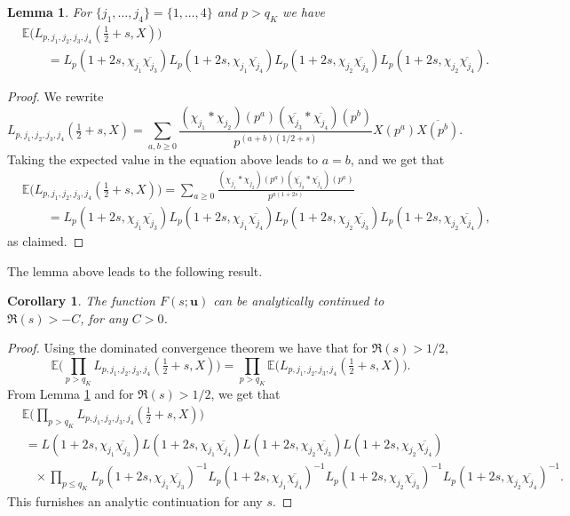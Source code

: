 \documentclass[12pt, reqno]{amsart}
\newcommand{\E}{\mathbb{E}}
\newcommand{\acom}[1]{{\color{blue}{Alexandra: #1}} }
\newtheorem{lemma}[theorem]{Lemma}
\newtheorem{corollary}[theorem]{Corollary}
\numberwithin{equation}{section}
\numberwithin{theorem}{section}
\numberwithin{equation}{section}
\begin{document}
    \begin{lemma}
    \label{bigp}
    For $\{j_1, \ldots, j_4\} = \{1,\ldots,4\}$ and $p>q_K$ we have 
   \begin{align*}
       &\E \Big( L_{p,j_1,j_2,j_3,j_4} ( \tfrac{1}{2}+s,X)\Big)\\
       &\qquad=L_p(1+2s, \chi_{j_1} \overline{\chi_{j_3}}) L_p(1+2s, \chi_{j_1} \overline{\chi_{j_4}}) L_p(1+2s, \chi_{j_2} \overline{\chi_{j_3}}) L_p(1+2s, \chi_{j_2} \overline{\chi_{j_4}}). 
       \end{align*} 
    \end{lemma}
    \begin{proof}
        We rewrite
        $$L_{p,j_1,j_2,j_3,j_4} ( \tfrac{1}{2}+s,X) = \sum_{a,b \geq 0} \frac{(\chi_{j_1}*\chi_{j_2})(p^{a})(\overline{\chi_{j_3}}*\overline{\chi_{j_4}})(p^{b})}{p^{(a+b)(1/2+s)}}X(p^{a}) \overline{X(p^{b})}.$$
        Taking the expected value in the equation above leads to $a=b$, and we get that
        \begin{align*}
        &\E \Big(L_{p,j_1,j_2,j_3,j_4} ( \tfrac{1}{2}+s,X) \Big)  = \sum_{a \geq 0} \frac{(\chi_{j_1}*\chi_{j_2})(p^{a})(\overline{\chi_{j_3}}*\overline{\chi_{j_4}})(p^{a})}{p^{a(1+2s)}}\\
        &\qquad= L_p(1+2s, \chi_{j_1} \overline{\chi_{j_3}}) L_p(1+2s, \chi_{j_1} \overline{\chi_{j_4}}) L_p(1+2s, \chi_{j_2} \overline{\chi_{j_3}}) L_p(1+2s, \chi_{j_2} \overline{\chi_{j_4}}),\end{align*}
    as claimed.
    \end{proof}
The lemma above leads to the following result.
\begin{corollary}
    The function $F(s;\textbf{u})$ can be analytically continued to $\Re(s)>-C$, for any $C >0$.
\end{corollary}
\begin{proof}
    Using the dominated convergence theorem we have that for $\Re(s)>1/2,$
    $$ \E \Bigg(  \prod_{p>q_K} L_{p,j_1,j_2,j_3,j_4}( \tfrac{1}{2}+s,X)\Bigg)= \prod_{p> q_K} \E \Big( L_{p,j_1,j_2,j_3,j_4} (  \tfrac{1}{2}+s,X)\Big).$$
    From Lemma \ref{bigp} and for $\Re(s)>1/2$, we get that
 \begin{align}\label{exp}
 & \E \Bigg(  \prod_{p>q_K} L_{p,j_1,j_2,j_3,j_4}( \tfrac{1}{2}+s,X )\Bigg) \nonumber \\
 &\ =L(1+2s,\chi_{j_1}\overline{\chi_{j_3}}) L(1+2s,\chi_{j_1}\overline{\chi_{j_4}}) L(1+2s,\chi_{j_2}\overline{\chi_{j_3}})L(1+2s,\chi_{j_2}\overline{\chi_{j_4}})  \\
  &\quad \times  \prod_{p \leq q_K} L_p(1+2s, \chi_{j_1} \overline{\chi_{j_3}})^{-1} L_p(1+2s, \chi_{j_1} \overline{\chi_{j_4}})^{-1} L_p(1+2s, \chi_{j_2} \overline{\chi_{j_3}})^{-1} L_p(1+2s, \chi_{j_2} \overline{\chi_{j_4}})^{-1}. \nonumber
 \end{align}   
 This furnishes an analytic continuation for any $s.$ 
\end{proof}
\end{document}
